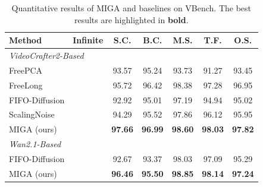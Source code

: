 \documentclass{llmxive}
\begin{document}
\begin{table}[t]
\centering
\small
\setlength{\tabcolsep}{3pt} %
\begin{tabular}{lcccccc}
    \toprule
    \textbf{Method} & \textbf{Infinite} & \textbf{S.C.} & \textbf{B.C.} & \textbf{M.S.} & \textbf{T.F.} & \textbf{O.S.} \\
    \midrule
    \multicolumn{7}{l}{\textit{VideoCrafter2-Based}} \\
    \midrule
    FreePCA           &  & 93.57 & 95.24 & 93.73 & 91.27 & 93.45 \\
    FreeLong          &  & 95.72 & 96.42 & 98.38 & 97.28 & 96.95 \\
    FIFO-Diffusion    &  & 92.92 & 95.01 & 97.19 & 94.94 & 95.02 \\
    ScalingNoise      &  & 94.29 & 95.52 & 97.86 & 96.12 & 95.95 \\
    MIGA (ours)       &  & \textbf{97.66} & \textbf{96.99} & \textbf{98.60} & \textbf{98.03} & \textbf{97.82} \\
    \midrule
    \multicolumn{7}{l}{\textit{Wan2.1-Based}} \\
    \midrule
    FIFO-Diffusion    &  & 92.67 & 93.37 & 98.03 & 97.09 & 95.29 \\
    MIGA (ours)       &  & \textbf{96.46} & \textbf{95.50} & \textbf{98.85} & \textbf{98.14} & \textbf{97.24} \\
    \bottomrule
\end{tabular}
\caption{Quantitative results of MIGA and baselines on VBench.
The best results are highlighted in \textbf{bold}.}
\label{tab:vbench-results}
\end{table}
\end{document}
